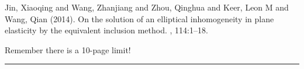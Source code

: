 \documentclass[twoside,twocolumn,10pt]{article}
\begin{document}
\begin{thebibliography}{99} %

Jin, Xiaoqing and Wang, Zhanjiang and Zhou, Qinghua and Keer, Leon M and Wang, Qian (2014).
\newblock On the solution of an elliptical inhomogeneity in plane elasticity by the equivalent inclusion method.
, 114:1--18.
 
\end{thebibliography}



\Large{Remember there is a 10-page limit!}
\hrule 
\newpage


\appendix
\end{document}
